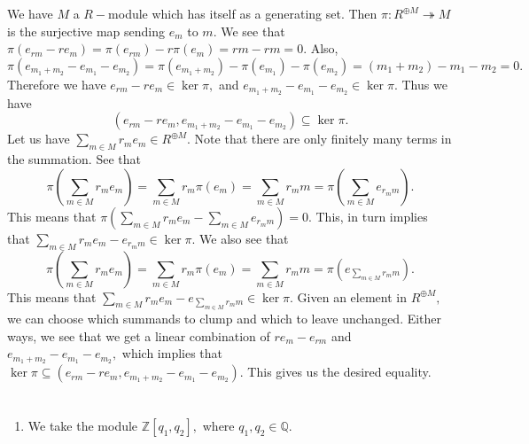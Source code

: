 \documentclass{article}
\begin{document}
\section{} %

\section{} %
We have $M$ a $R-$module which has itself as a generating set. Then $\pi: R^{\oplus M}\twoheadrightarrow M$ is the surjective map sending $e_m$ to $m.$ We 
see that $\pi(e_{rm}-re_m)=\pi(e_{rm})-r\pi(e_m)=rm-rm=0.$ Also, $\pi(e_{m_1+m_2}-e_{m_1}-e_{m_2})=\pi(e_{m_1+m_2})-\pi(e_{m_1})-\pi(e_{m_2})= 
(m_1+m_2)-m_1-m_2=0.$ Therefore we have $ e_{rm}-re_m \in \ker \pi, $ and $e_{m_1+m_2}-e_{m_1}-e_{m_2} \in \ker \pi.$ Thus we have 
$$(e_{rm}-re_m,e_{m_1+m_2}-e_{m_1}-e_{m_2}) \subseteq \ker \pi.$$ Let us have $\sum_{m \in M}r_m e_m \in R^{\oplus M}.$ Note that there are only finitely 
many 
terms in the summation. See that $$\pi(\sum_{m \in M}r_m e_m)=\sum_{m \in M}r_m \pi(e_m)= \sum_{m \in M}r_m m = \pi(\sum_{m \in M}e_{r_mm}).$$ This means 
that 
$\pi(\sum_{m \in M}r_m e_m - \sum_{m \in M}e_{r_mm})=0.$ This, in turn implies that $ \sum_{m \in M} r_me_m - e_{r_mm} \in \ker \pi.$ We also see that 
$$\pi(\sum_{m \in M}r_m e_m)=\sum_{m \in M}r_m \pi(e_m)= \sum_{m \in M}r_m m = \pi(e_{\sum_{m \in M}r_mm}).$$ This means that $\sum_{m \in M}r_m 
e_m-e_{\sum_{m \in M}r_mm} \in \ker \pi.$ Given an element in $R^{\oplus M},$ we can choose which summands to clump and which to leave unchanged. Either 
ways, we see that we get a linear combination of $re_m-e_{rm}$ and $e_{m_1+m_2}-e_{m_1}-e_{m_2},$ which implies that $ \ker \pi \subseteq 
(e_{rm}-re_m,e_{m_1+m_2}-e_{m_1}-e_{m_2}).$ This gives us the desired equality.
\section{} %
\begin{enumerate}
	\item We take the module $\mathbb{Z}[q_1,q_2],$ where $q_1,q_2 \in \mathbb{Q}.$ 
\end{enumerate}
\end{document}
